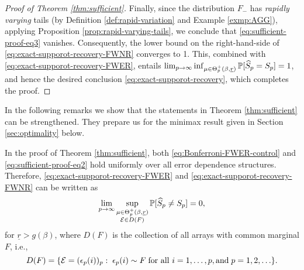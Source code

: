 \begin{proof}[Proof of Theorem \ref{thm:sufficient}]
Finally, since the distribution $F_-$ has \emph{rapidly varying} tails (by Definition \ref{def:rapid-variation} and Example \ref{exmp:AGG}), applying Proposition \ref{prop:rapid-varying-tails}, we conclude that \eqref{eq:sufficient-proof-eq3} vanishes. Consequently, the lower bound on the right-hand-side of \eqref{eq:exact-supporot-recovery-FWNR} converges to 1.
This, combined with \eqref{eq:exact-supporot-recovery-FWER}, entails {$\lim_{p\to\infty} \inf_{\mu\in\Theta_p^+(\beta, \underline{r})} \P[\widehat{S}_p = S_p]= 1$, and hence the desired conclusion \eqref{eq:exact-supporot-recovery}, which completes the proof}.
\end{proof}

In the following remarks we show that the statements in Theorem \ref{thm:sufficient} can be strengthened. They 
prepare us for the minimax result given in Section \ref{sec:optimality} below.

\begin{remark} \label{rmk:sufficient-strengthened}
In the proof of Theorem \ref{thm:sufficient}, both \eqref{eq:Bonferroni-FWER-control} and \eqref{eq:sufficient-proof-eq2} hold uniformly over all error dependence structures.
Therefore, \eqref{eq:exact-supporot-recovery-FWER} and \eqref{eq:exact-supporot-recovery-FWNR} can be written as
\begin{equation} \label{eq:exact-supporot-recovery-strengthened}
    \lim_{p\to\infty}\sup_{\substack{\mu\in\Theta_p^+(\beta, \underline{r})\\ {\cal E}\in D(F)}} \P[\widehat{S}_p \neq S_p] = 0,
\end{equation}
for $\underline{r} > g(\beta)$, where $D(F)$ is the collection of all arrays with common marginal $F$, i.e., 
\begin{equation} \label{eq:common-marginal-distribution}
    D(F)=\{{\cal E}=(\epsilon_p(i))_p:\;\epsilon_p(i)\sim F\;\text{for all }i=1,\ldots,p, \text{and}\; p=1,2,\ldots\}.
\end{equation}
\end{remark}


